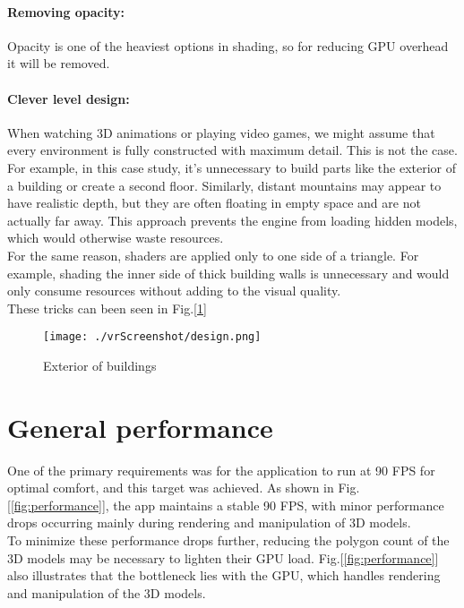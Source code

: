 \paragraph{Removing opacity:}
Opacity is one of the heaviest options in shading, so for reducing GPU overhead it will be removed.

\paragraph{Clever level design:}
When watching 3D animations or playing video games, we might assume that every environment is fully constructed with maximum detail.
This is not the case. For example, in this case study, it's unnecessary to build parts like the exterior of a building or create a second floor.
Similarly, distant mountains may appear to have realistic depth, but they are often floating in empty space and are not actually far away.
This approach prevents the engine from loading hidden models, which would otherwise waste resources.\\
For the same reason, shaders are applied only to one side of a triangle.
For example, shading the inner side of thick building walls is unnecessary and would only consume resources without adding to the visual quality.\\
These tricks can been seen in Fig.[\ref{fig:design}]



\begin{figure}[ht]
  \centering
  \texttt{[image: ./vrScreenshot/design.png]}
  \caption{Exterior of buildings}
  \label{fig:design}
\end{figure}

\section{General performance}
\noindent
One of the primary requirements was for the application to run at 90 \ac{FPS} for optimal comfort, and this target was achieved. As shown in Fig.[\ref{fig:performance}],
the app maintains a stable 90 \ac{FPS}, with minor performance drops occurring mainly during rendering and manipulation of 3D models.\\
To minimize these performance drops further, reducing the polygon count of the 3D models may be necessary to lighten their GPU load.
Fig.[\ref{fig:performance}] also illustrates that the bottleneck lies with the GPU, which handles rendering and manipulation of the 3D models.

